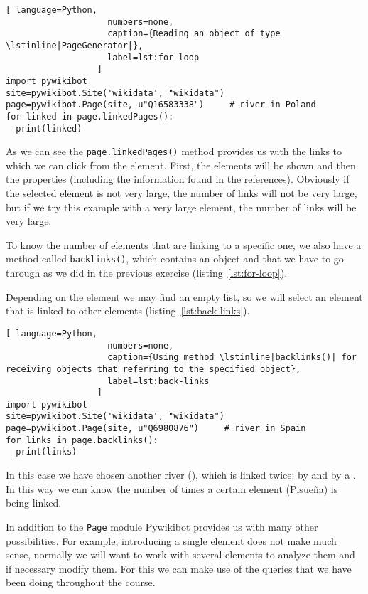 \begin{lstlisting}[ language=Python,
                    numbers=none,
                    caption={Reading an object of type \lstinline|PageGenerator|},
                    label=lst:for-loop
                  ]
import pywikibot
site=pywikibot.Site('wikidata', "wikidata")
page=pywikibot.Page(site, u"Q16583338")     # river in Poland
for linked in page.linkedPages():
  print(linked)
\end{lstlisting}

As we can see the \lstinline|page.linkedPages()| method provides us with the links to which we can click from the element. 
First, the elements will be shown and then the properties (including the information found in the references). Obviously if the selected element is not very large, the number of links will not be very large, but if we try this example with a very large element, the number of links will be very large.

To know the number of elements that are linking to a specific one,
we also have a method called \lstinline|backlinks()|, which contains an object and that we have to go through as we did in the previous exercise (listing~\ref{lst:for-loop}).

Depending on the element we may find an empty list, so we will select an element that is linked to other elements (listing~\ref{lst:back-links}).

\begin{lstlisting}[ language=Python,
                    numbers=none,
                    caption={Using method \lstinline|backlinks()| for receiving objects that referring to the specified object},
                    label=lst:back-links
                  ]
import pywikibot
site=pywikibot.Site('wikidata', "wikidata")
page=pywikibot.Page(site, u"Q6980876")     # river in Spain
for links in page.backlinks():
  print(links)
\end{lstlisting}

In this case we have chosen another river (), 
which is linked twice: by  and by a . 
In this way we can know the number of times a certain element (Pisueña) is being linked.


In addition to the \lstinline|Page| module Pywikibot provides us with many other possibilities. 
For example, introducing a single element does not make much sense, normally we will want to work with several elements to analyze them and if necessary modify them. For this we can make use of the queries that we have been doing throughout the course.



